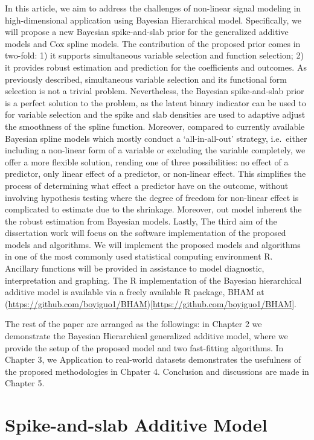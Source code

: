 \documentclass[AMA,STIX1COL,]{WileyNJD-v2}
\begin{document}
In this article, we aim to address the challenges of non-linear signal
modeling in high-dimensional application using Bayesian Hierarchical
model. Specifically, we will propose a new Bayesian spike-and-slab prior
for the generalized additive models and Cox spline models. The
contribution of the proposed prior comes in two-fold: 1) it supports
simultaneous variable selection and function selection; 2) it provides
robust estimation and prediction for the coefficients and outcomes. As
previously described, simultaneous variable selection and its functional
form selection is not a trivial problem. Nevertheless, the Bayesian
spike-and-slab prior is a perfect solution to the problem, as the latent
binary indicator can be used to for variable selection and the spike and
slab densities are used to adaptive adjust the smoothness of the spline
function. Moreover, compared to currently available Bayesian spline
models which mostly conduct a `all-in-all-out' strategy, i.e.~either
including a non-linear form of a variable or excluding the variable
completely, we offer a more flexible solution, rending one of three
possibilities: no effect of a predictor, only linear effect of a
predictor, or non-linear effect. This simplifies the process of
determining what effect a predictor have on the outcome, without
involving hypothesis testing where the degree of freedom for non-linear
effect is complicated to estimate due to the shrinkage. Moreover, out
model inherent the the robust estimation from Bayesian models. Lastly,
The third aim of the dissertation work will focus on the software
implementation of the proposed models and algorithms. We will implement
the proposed models and algorithms in one of the most commonly used
statistical computing environment R. Ancillary functions will be
provided in assistance to model diagnostic, interpretation and graphing.
The R implementation of the Bayesian hierarchical additive model is
available via a freely available R package, BHAM at
(\url{https://github.com/boyiguo1/BHAM}){[}\url{https://github.com/boyiguo1/BHAM}{]}.

The rest of the paper are arranged as the followings: in Chapter 2 we
demonstrate the Bayesian Hierarchical generalized additive model, where
we provide the setup of the proposed model and two fast-fitting
algorithms. In Chapter 3, we Application to real-world datasets
demonstrates the usefulness of the proposed methodologies in Chpater 4.
Conclusion and discussions are made in Chapter 5.

\hypertarget{spike-and-slab-additive-model}{%
\section{Spike-and-slab Additive
Model}\label{spike-and-slab-additive-model}}
\end{document}
